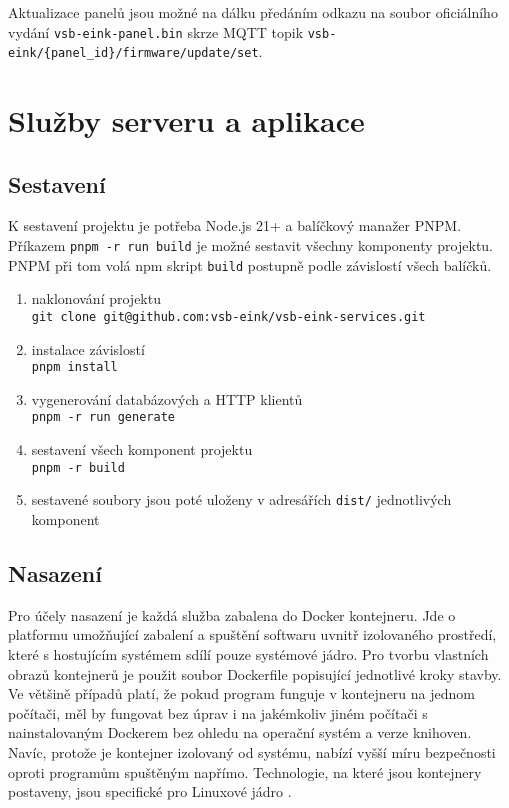 Aktualizace panelů jsou možné na dálku předáním odkazu na soubor oficiálního vydání \lstinline|vsb-eink-panel.bin| skrze MQTT topik \lstinline|vsb-eink/{panel_id}/firmware/update/set|.

\section{Služby serveru a aplikace}
\subsection{Sestavení}
K sestavení projektu je potřeba Node.js 21+ a balíčkový manažer PNPM. Příkazem \lstinline|pnpm -r run build| je možné sestavit všechny komponenty projektu. PNPM při tom volá npm skript \lstinline|build| postupně podle závislostí všech balíčků.

\begin{enumerate}
    \item naklonování projektu \\ \lstinline{git clone git@github.com:vsb-eink/vsb-eink-services.git}
    \item instalace závislostí \\ \lstinline{pnpm install}
    \item vygenerování databázových a HTTP klientů \\ \lstinline{pnpm -r run generate}
    \item sestavení všech komponent projektu \\ \lstinline{pnpm -r build}
    \item sestavené soubory jsou poté uloženy v adresářích \lstinline|dist/| jednotlivých komponent 
\end{enumerate}

\subsection{Nasazení}
Pro účely nasazení je každá služba zabalena do Docker kontejneru. Jde o platformu umožňující zabalení a spuštění softwaru uvnitř izolovaného prostředí, které s hostujícím systémem sdílí pouze systémové jádro. Pro tvorbu vlastních obrazů kontejnerů je použit soubor Dockerfile popisující jednotlivé kroky stavby. Ve většině případů platí, že pokud program funguje v kontejneru na jednom počítači, měl by fungovat bez úprav i na jakémkoliv jiném počítači s nainstalovaným Dockerem bez ohledu na operační systém a verze knihoven. Navíc, protože je kontejner izolovaný od systému, nabízí vyšší míru bezpečnosti oproti programům spuštěným napřímo. Technologie, na které jsou kontejnery postaveny, jsou specifické pro Linuxové jádro \cite{DockerOverview0200}. 

